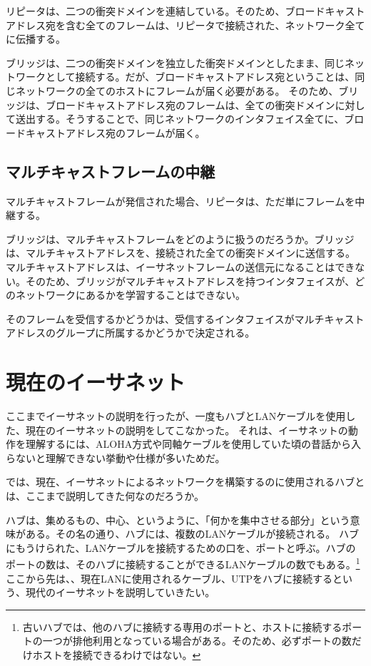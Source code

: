 リピータは、二つの衝突ドメインを連結している。そのため、ブロードキャストアドレス宛を含む全てのフレームは、リピータで接続された、ネットワーク全てに伝播する。

ブリッジは、二つの衝突ドメインを独立した衝突ドメインとしたまま、同じネットワークとして接続する。だが、ブロードキャストアドレス宛ということは、同じネットワークの全てのホストにフレームが届く必要がある。
そのため、ブリッジは、ブロードキャストアドレス宛のフレームは、全ての衝突ドメインに対して送出する。そうすることで、同じネットワークのインタフェイス全てに、ブロードキャストアドレス宛のフレームが届く。

\subsection{マルチキャストフレームの中継}
マルチキャストフレームが発信された場合、リピータは、ただ単にフレームを中継する。

ブリッジは、マルチキャストフレームをどのように扱うのだろうか。ブリッジは、マルチキャストアドレスを、接続された全ての衝突ドメインに送信する。
マルチキャストアドレスは、イーサネットフレームの送信元になることはできない。そのため、ブリッジがマルチキャストアドレスを持つインタフェイスが、どのネットワークにあるかを学習することはできない。

そのフレームを受信するかどうかは、受信するインタフェイスがマルチキャストアドレスのグループに所属するかどうかで決定される。


\section{現在のイーサネット}

ここまでイーサネットの説明を行ったが、一度もハブとLANケーブルを使用した、現在のイーサネットの説明をしてこなかった。
それは、イーサネットの動作を理解するには、ALOHA方式や同軸ケーブルを使用していた頃の昔話から入らないと理解できない挙動や仕様が多いためだ。

では、現在、イーサネットによるネットワークを構築するのに使用されるハブとは、ここまで説明してきた何なのだろうか。

ハブは、集めるもの、中心、というように、「何かを集中させる部分」という意味がある。その名の通り、ハブには、複数のLANケーブルが接続される。
ハブにもうけられた、LANケーブルを接続するための口を、ポートと呼ぶ。ハブのポートの数は、そのハブに接続することができるLANケーブルの数でもある。\footnote{古いハブでは、他のハブに接続する専用のポートと、ホストに接続するポートの一つが排他利用となっている場合がある。そのため、必ずポートの数だけホストを接続できるわけではない。}ここから先は、、現在LANに使用されるケーブル、UTPをハブに接続するという、現代のイーサネットを説明していきたい。

